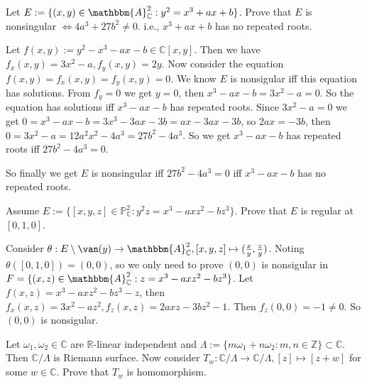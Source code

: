 \documentclass{ctexart}
\newif\ifpreface
\begin{document}
\large
\setlength{\baselineskip}{1.2em}
\ifpreface
    
\newgeometry{left=2cm,right=2cm,top=2cm,bottom=2cm}
\else
{}
\maketitle
\fi
\begin{problem}
  Let \(E:=\{(x,y) \in \mathbbm{A}_{\mathbb{C}}^2:y^2=x^3+ax+b\}\). Prove that \(E\) is nonsingular \(\iff 4a^3+27b^2 \neq 0\). 
  i.e., \(x^3+ax+b\) has no repeated roots. 
\end{problem}

\begin{solution}
  Let \(f(x,y):=y^2-x^3-ax-b \in \mathbb{C}[x,y]\). Then we have \(f_x(x,y)=3x^2-a,f_y(x,y)=2y\). 
  Now consider the equation \(f(x,y)=f_x(x,y)=f_y(x,y)=0\). We know \(E\) is nonsigular iff this equation has solutions. 
  From \(f_y=0\) we get \(y=0\), then \(x^3-ax-b=3x^2-a=0\). So the equation has solutions iff \(x^3-ax-b\) has repeated roots. 
  Since \(3x^2-a=0\) we get \(0=x^3-ax-b=3x^3-3ax-3b=ax-3ax-3b\), so \(2ax=-3b\), then \(0=3x^2-a=12a^2x^2-4a^3=27b^2-4a^3\). 
  So we get \(x^3-ax-b\) has repeated roots iff \(27b^2-4a^3=0\). 

  So finally we get \(E\) is nonsingular iff \(27b^2-4a^3=0 \) iff \(x^3-ax-b\) has no repeated roots. 
\end{solution}

\begin{problem}
  Assume \(E:=\{[x,y,z] \in \mathbb{P}_{\mathbb{C}}^2:y^2z=x^3-axz^2-bz^3\}\). Prove that \(E\) is regular at \([0,1,0]\).
\end{problem}

\begin{solution}
  Consider \(\theta:E\setminus \van(y) \to \mathbbm{A}_{\mathbb{C}}^2,[x,y,z] \mapsto (\frac{x}{y}, \frac{z}{y})\). 
  Noting \(\theta([0,1,0])=(0,0)\), so we only need to prove \((0,0)\) is nonsigular in \(F=\{(x,z)\in \mathbbm{A}_{\mathbb{C}}^2:z=x^3-axz^2-bz^3\}\). 
  Let \(f(x,z)=x^3-axz^2-bz^3-z\), then \(f_x(x,z)=3x^2-az^2,f_z(x,z)=2axz-3bz^2-1\). 
  Then \(f_z(0,0)=-1 \neq 0\). So \((0,0)\) is nonsigular. 
\end{solution}

\begin{problem}
  Let \(\omega_1,\omega_2 \in \mathbb{C}\) are \(\mathbb{R}\)-linear independent and \(\Lambda:=\{m \omega_1+ n \omega_2:m,n \in \mathbb{Z}\}\subset \mathbb{C}\). 
  Then \(\mathbb{C} / \Lambda\) is Riemann surface. Now consider \(T_w:\mathbb{C} / \Lambda \to \mathbb{C} / \Lambda,[z] \mapsto [z + w]\) for some \(w \in \mathbb{C}\). 
  Prove that \(T_w\) is homomorphism. 
\end{problem}
\end{document}
